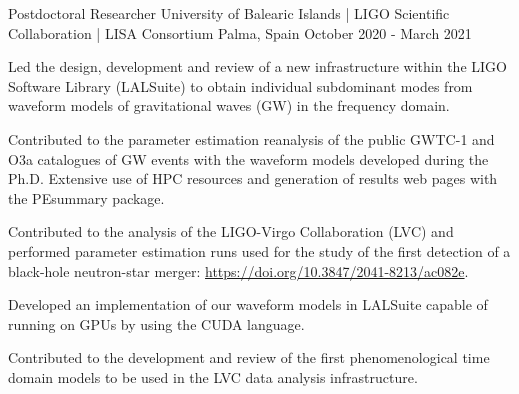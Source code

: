 \begin{cventries}
  \cventry
    {Postdoctoral Researcher}
    {University of Balearic Islands |  LIGO Scientific Collaboration | LISA Consortium}
    {Palma, Spain}
    {October 2020 - March 2021}
    {
      \begin{cvitems}
        \item {Led the design, development and review of a new infrastructure within the LIGO Software Library (LALSuite) to obtain individual subdominant modes from waveform models of gravitational waves (GW) in the frequency domain.}
        \item {Contributed to the parameter estimation reanalysis of the public GWTC-1 and O3a catalogues of GW events with the waveform models developed during the Ph.D. Extensive use of HPC resources and generation of results web pages with the PEsummary package.}
        \item {Contributed to the analysis of the LIGO-Virgo Collaboration (LVC) and performed parameter estimation runs used for the study of the first detection of a black-hole neutron-star merger:  \url{https://doi.org/10.3847/2041-8213/ac082e}.}
        \item {Developed an implementation of our waveform models in LALSuite capable of running on GPUs by using the CUDA language.}
        \item {Contributed to the development and review of the first phenomenological time domain models to be used in the LVC data analysis infrastructure.}
      \end{cvitems}
    }\vspace{-10pt}
    

\end{cventries}
